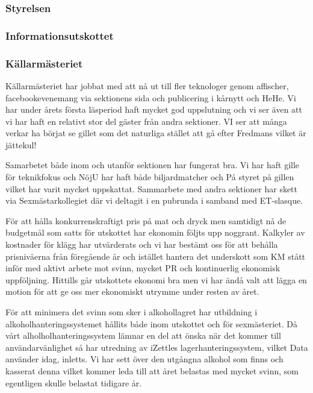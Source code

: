 \documentclass[../_main/handlingar.tex]{subfiles}
\begin{document}

\subsubsection*{Styrelsen}

\subsubsection*{Informationsutskottet}

\subsubsection*{Källarmästeriet}

Källarmästeriet har jobbat med att nå ut till fler teknologer genom affischer, facebookevenemang via sektionens sida och publicering i kårnytt och HeHe. Vi har under årets första läsperiod haft mycket god uppslutning och vi ser även att vi har haft en relativt stor del gäster från andra sektioner. VI ser att många verkar ha börjat se gillet som det naturliga stället att gå efter Fredmans vilket är jättekul! 

Samarbetet både inom och utanför sektionen har fungerat bra. Vi har haft gille för teknikfokus och NöjU har haft både biljardmatcher och På styret på gillen vilket har varit mycket uppskattat. Sammarbete med andra sektioner har skett via Sexmästarkollegiet där vi deltagit i en pubrunda i samband med ET-slasque. 

För att hålla konkurrenskraftigt pris på mat och dryck men samtidigt nå de budgetmål som satts för utskottet har ekonomin följts upp noggrant. Kalkyler av kostnader för klägg har utvärderats och vi har bestämt oss för att behålla prisnivåerna från föregående år och istället hantera det underskott som KM stått inför med aktivt arbete mot svinn, mycket PR och kontinuerlig ekonomisk uppföljning. Hittills går utskottets ekonomi bra men vi har ändå valt att lägga en motion för att ge oss mer ekonomiskt utrymme under resten av året.  

För att minimera det svinn som sker i alkohollagret har utbildning i alkoholhanteringssystemet hållits både inom utskottet och för sexmästeriet. Då vårt alholholhanteringssystem lämnar en del att önska när det kommer till användarvänlighet så har utredning av iZettles lagerhanteringssystem, vilket Data använder idag, inletts. Vi har sett över den utgångna alkohol som finns och kasserat denna vilket kommer leda till att året belastas med mycket svinn, som egentligen skulle belastat tidigare år. 
\end{document}
